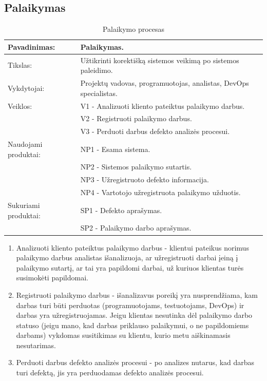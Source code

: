 \documentclass{VUMIFPSkursinis}
\begin{document}
	\subsection{Palaikymas}
	\begin{center}
		\begin{table}[ht]
			\caption{Palaikymo procesas}
			\begin{tabular}{ | l | l | }
				\hline
				Pavadinimas:		& Palaikymas.								\\ \hline
				Tikslas:		& Užtikrinti korektišką sistemos veikimą po sistemos paleidimo.		\\ \hline
				Vykdytojai:		& Projektų vadovas, programuotojas, analistas, DevOps specialistas.	\\ \hline
				Veiklos:		& V1 - Analizuoti kliento pateiktus palaikymo darbus.			\\
							& V2 - Registruoti palaikymo darbus. 					\\
							& V3 - Perduoti darbus defekto analizės procesui.			\\ \hline

				Naudojami produktai:	& NP1 - Esama sistema.							\\
							& NP2 - Sistemos palaikymo sutartis.					\\
							& NP3 - Užregistruoto defekto informacija.				\\
							& NP4 - Vartotojo užregistruota palaikymo užduotis.			\\ \hline
				Sukuriami produktai:	& SP1 - Defekto aprašymas.						\\
							& SP2 - Palaikymo darbo aprašymas.					\\ \hline
			\end{tabular}
		\end{table}
	\end{center}

	\begin{enumerate}
		\item{
			Analizuoti kliento pateiktus palaikymo darbus - klientui pateikus norimus palaikymo darbus analistas išanalizuoja, ar užregistruoti darbai įeiną į palaikymo sutartį, ar tai yra papildomi darbai, už kuriuos klientas turės susimokėti papildomai.
		}
		\item{
			Registruoti palaikymo darbus - išanalizavus poreikį yra nusprendžiama, kam darbas turi būti perduotas (programuotojams, testuotojams, DevOps) ir darbas yra užregistruojamas.
			Jeigu klientas nesutinka dėl palaikymo darbo statuso (jeigu mano, kad darbas priklauso palaikymui, o ne papildomiems darbams) vykdomas susitikimas su klientu, kurio metu aiškinamasis nesutarimas.
		}
		\item{
			Perduoti darbus defekto analizės procesui - po analizes nutarus, kad darbas turi defektą, jis yra perduodamas defekto analizės procesui.
		}
	\end{enumerate}
\end{document}

